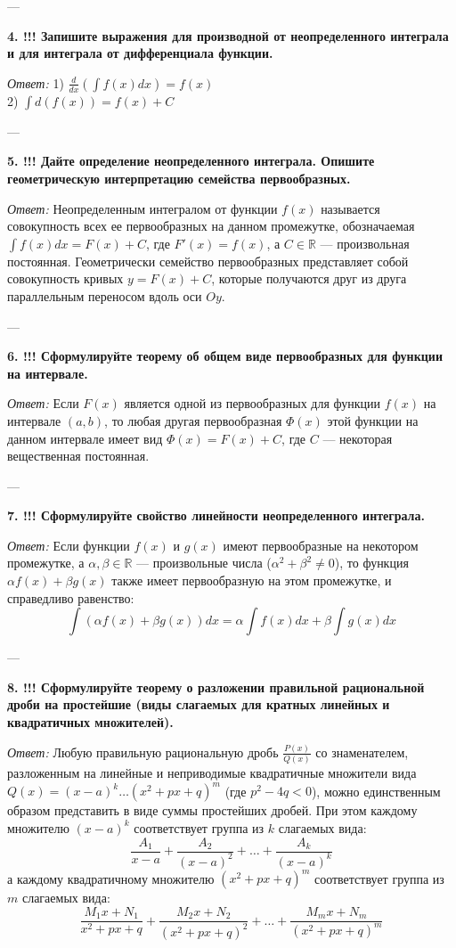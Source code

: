\documentclass{article}
\begin{document}
---

\textbf{4. !!! Запишите выражения для производной от неопределенного интеграла и для интеграла от дифференциала функции.}

\textit{Ответ:}
1) $\frac{d}{dx} \left( \int f(x) dx \right) = f(x)$ \\
2) $\int d(f(x)) = f(x) + C$

---

\textbf{5. !!! Дайте определение неопределенного интеграла. Опишите геометрическую интерпретацию семейства первообразных.}

\textit{Ответ:} Неопределенным интегралом от функции $f(x)$ называется совокупность всех ее первообразных на данном промежутке, обозначаемая $\int f(x) dx = F(x) + C$, где $F'(x) = f(x)$, а $C \in \mathbb{R}$ — произвольная постоянная. Геометрически семейство первообразных представляет собой совокупность кривых $y = F(x) + C$, которые получаются друг из друга параллельным переносом вдоль оси $Oy$.

---

\textbf{6. !!! Сформулируйте теорему об общем виде первообразных для функции на интервале.}

\textit{Ответ:} Если $F(x)$ является одной из первообразных для функции $f(x)$ на интервале $(a, b)$, то любая другая первообразная $\Phi(x)$ этой функции на данном интервале имеет вид $\Phi(x) = F(x) + C$, где $C$ — некоторая вещественная постоянная.

---

\textbf{7. !!! Сформулируйте свойство линейности неопределенного интеграла.}

\textit{Ответ:} Если функции $f(x)$ и $g(x)$ имеют первообразные на некотором промежутке, а $\alpha, \beta \in \mathbb{R}$ — произвольные числа ($\alpha^2 + \beta^2 \neq 0$), то функция $\alpha f(x) + \beta g(x)$ также имеет первообразную на этом промежутке, и справедливо равенство:
$$ \int (\alpha f(x) + \beta g(x)) dx = \alpha \int f(x) dx + \beta \int g(x) dx $$

---

\textbf{8. !!! Сформулируйте теорему о разложении правильной рациональной дроби на простейшие (виды слагаемых для кратных линейных и квадратичных множителей).}

\textit{Ответ:} Любую правильную рациональную дробь $\frac{P(x)}{Q(x)}$ со знаменателем, разложенным на линейные и неприводимые квадратичные множители вида $Q(x) = (x-a)^k \dots (x^2+px+q)^m$ (где $p^2-4q < 0$), можно единственным образом представить в виде суммы простейших дробей. При этом каждому множителю $(x-a)^k$ соответствует группа из $k$ слагаемых вида:
$$ \frac{A_1}{x-a} + \frac{A_2}{(x-a)^2} + \dots + \frac{A_k}{(x-a)^k} $$
а каждому квадратичному множителю $(x^2+px+q)^m$ соответствует группа из $m$ слагаемых вида:
$$ \frac{M_1 x + N_1}{x^2+px+q} + \frac{M_2 x + N_2}{(x^2+px+q)^2} + \dots + \frac{M_m x + N_m}{(x^2+px+q)^m} $$
\end{document}
